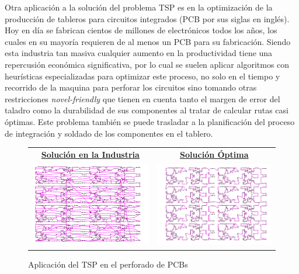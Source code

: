 \documentclass[10pt,a4paper]{article}
\begin{document}
Otra aplicación a la solución del problema TSP es en la optimización de la producción de tableros para circuitos integrados (PCB por sus siglas en inglés).
Hoy en día se fabrican cientos de millones de electrónicos todos los años, los cuales en su mayoría requieren de al menos un PCB para su fabricación. Siendo esta industria tan masiva cualquier aumento en la productividad tiene una repercusión económica significativa, por lo cual se suelen aplicar algoritmos con heurísticas especializadas para optimizar este proceso, no solo en el tiempo y recorrido de la maquina para perforar los circuitos sino tomando otras restricciones \emph{novel-friendly} que tienen en cuenta tanto el margen de error del taladro como la durabilidad de sus componentes al tratar de calcular rutas casi óptimas\cite{teo:PCB}. Este problema también se puede trasladar a la planificación del proceso de integración y soldado de los componentes en el tablero. 
\begin{figure}[h!]
    \centering
    \centering
    \begin{tabular}{c c}
        \textbf{\underline{Solución en la Industria}} & \textbf{\underline{Solución Óptima}} \\
        \includegraphics[scale=0.5]{img/tsp1.png} & \includegraphics[scale=0.5]{img/tsp2.png}
    \end{tabular}
    \captionsetup{justification=centering}
    \caption{Aplicación del TSP en el perforado de PCBs}%
    \label{fig:sol_ind}%
\end{figure}
\end{document}
